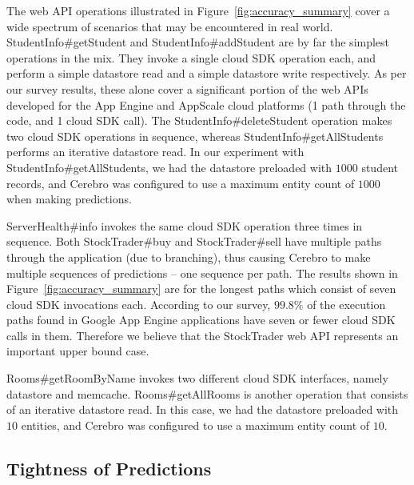 The web API operations illustrated in Figure~\ref{fig:accuracy_summary} cover
a wide spectrum of scenarios that may be encountered in real world.
StudentInfo\#getStudent and StudentInfo\#addStudent are by far the simplest
operations in the mix. They invoke a single cloud SDK operation each, and
perform a simple datastore read and a simple datastore write respectively. As
per our survey results, these alone cover a significant portion of the web
APIs developed for the App Engine and AppScale cloud platforms (1 path through
the code, and 1 cloud SDK call).  The StudentInfo\#deleteStudent operation
makes two cloud SDK operations in sequence, whereas
StudentInfo\#getAllStudents performs an iterative datastore read.  In our
experiment with StudentInfo\#getAllStudents, we had the datastore preloaded
with $1000$ student records, and Cerebro was configured to use a maximum entity
count of $1000$ when making predictions.

ServerHealth\#info invokes the same cloud SDK operation three times in
sequence. Both StockTrader\#buy and StockTrader\#sell have multiple paths
through the application 
(due to branching), thus causing Cerebro to make multiple
sequences of predictions -- one sequence per path. The results shown in
Figure~\ref{fig:accuracy_summary} are for the longest paths which consist of
seven cloud SDK invocations each. According to our survey, $99.8\%$ of the
execution paths found in Google App Engine applications have seven or 
fewer cloud SDK
calls in them. Therefore we believe that the StockTrader web API
represents an important upper bound case. 

Rooms\#getRoomByName
invokes two different cloud SDK interfaces, namely datastore and memcache.
Rooms\#get\-AllRooms is another operation that consists of an iterative
datastore read. In this case, we had the datastore preloaded with $10$ entities,
and Cerebro was configured to use a maximum entity count of $10$. 

\subsection{Tightness of Predictions}

